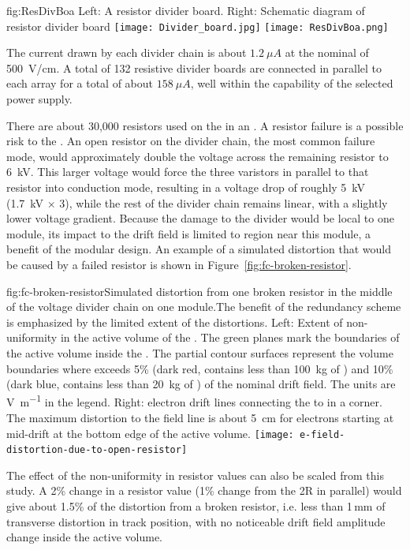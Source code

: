 \begin{dunefigure}{fig:ResDivBoa}
  {Left: A  resistor divider board. Right: Schematic diagram of resistor divider board}
  \texttt{[image: Divider\_board.jpg]}
  \texttt{[image: ResDivBoa.png]}
\end{dunefigure}


The current drawn by each divider chain is about $1.2~\mu A$ at the nominal \efield{} of \SI{500}{V/cm}. A total of 132 resistive divider 
boards are connected in parallel to each  array for a total of about $158~\mu A$, well within the capability of the selected  power supply.

There are about 30,000 resistors used on the  in an . A resistor failure is a possible risk to the .  
An open resistor on the divider chain, the most common failure mode, would approximately double the voltage across the remaining resistor to \SI{6}{kV}.  This larger voltage would force the three varistors in parallel to that resistor into conduction mode, resulting in a voltage drop of roughly \SI{5}{kV} (\SI{1.7}{kV} $\times$ \num{3}), while the rest of the divider chain remains linear, with a slightly lower voltage gradient. 
Because the damage to the divider would be local to one module, its impact to the  drift field is limited to region near this module, a benefit of the modular  design.
An example of a simulated \efield{} distortion that would be caused by a failed resistor is shown in Figure~\ref{fig:fc-broken-resistor}. 

\begin{dunefigure}{fig:fc-broken-resistor}{Simulated \efield{} distortion from one broken resistor in the middle of the voltage divider chain on one  module.The benefit of the redundancy scheme is emphasized by the limited extent of the \efield distortions. Left: Extent of \efield{} non-uniformity in the active volume of the . The green planes mark the boundaries of the active volume inside the . The partial contour surfaces represent the volume boundaries where \efield{} exceeds 5\% (dark red, contains less than \SI{100}{kg} of ) and 10\% (dark blue, contains less than \SI{20}{kg} of ) of the nominal drift field. The units are \si{\volt\per\m} in the legend. Right: electron drift lines connecting the  to  in a %
 corner.  The maximum distortion to the field line is about \SI{5}{cm} for electrons starting at mid-drift at the bottom edge of the active volume.}
\texttt{[image: e-field-distortion-due-to-open-resistor]}
\end{dunefigure}
The effect of the non-uniformity in resistor values can also be scaled from this study.  A 2\% change in a resistor value (1\% change from the 2R in parallel) would give about 1.5\% of the distortion from a broken resistor, i.e. less than 1\,mm of transverse distortion in track position, with no noticeable drift field amplitude change inside the active volume.
 
